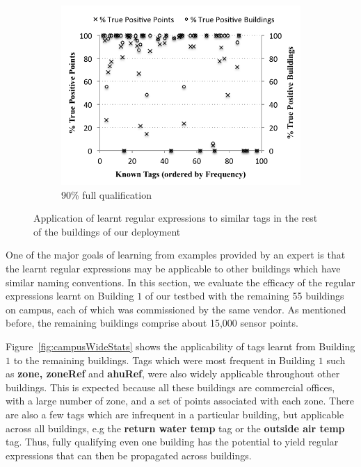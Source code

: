 \begin{figure}[H]
\begin{subfigure}{0.4\textwidth}
		\includegraphics[width=\textwidth]{./figs/recallCampusWide-90.pdf}
                \caption{90\% full qualification}
	\end{subfigure}
\caption{Application of learnt regular expressions to similar tags in the rest of the buildings of our deployment}
\label{fig:campuswide}
\end{figure}



One of the major goals of learning from examples provided by an expert is that the learnt regular expressions may be applicable to other buildings which have similar naming conventions. In this section, we evaluate the efficacy of the regular expressions learnt on Building $1$ of our testbed with the remaining 55 buildings on campus, each of which was commissioned by the same vendor. As mentioned before, the remaining buildings comprise about 15,000 sensor points.

Figure~\ref{fig:campusWideStats} shows the applicability of tags learnt from Building $1$ to the remaining buildings. Tags which were most frequent in Building $1$ such as {\bf zone, zoneRef} and {\bf ahuRef}, were also widely applicable throughout other buildings. This is expected because all these buildings are commercial offices, with a large number of zone, and a set of points associated with each zone. There are also a few tags which are infrequent in a particular building, but applicable across all buildings, e.g the {\bf return water temp} tag or the {\bf outside air temp} tag. Thus, fully qualifying even one building has the potential to yield regular expressions that can then be propagated across buildings.

